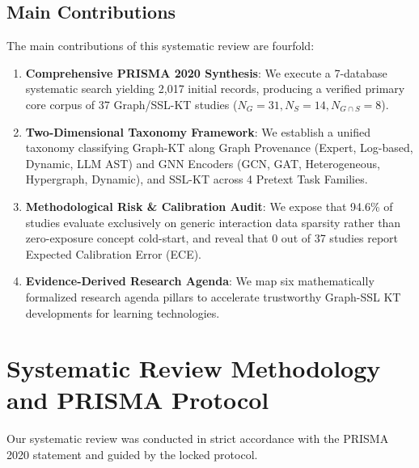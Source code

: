 \documentclass[journal]{IEEEtran}
\begin{document}
\subsection{Main Contributions}
The main contributions of this systematic review are fourfold:
\begin{enumerate}
    \item \textbf{Comprehensive PRISMA 2020 Synthesis}: We execute a 7-database systematic search yielding 2,017 initial records, producing a verified primary core corpus of 37 Graph/SSL-KT studies ($N_G=31, N_S=14, N_{G \cap S}=8$).
    \item \textbf{Two-Dimensional Taxonomy Framework}: We establish a unified taxonomy classifying Graph-KT along Graph Provenance (Expert, Log-based, Dynamic, LLM AST) and GNN Encoders (GCN, GAT, Heterogeneous, Hypergraph, Dynamic), and SSL-KT across 4 Pretext Task Families.
    \item \textbf{Methodological Risk \& Calibration Audit}: We expose that 94.6\% of studies evaluate exclusively on generic interaction data sparsity rather than zero-exposure concept cold-start, and reveal that 0 out of 37 studies report Expected Calibration Error (ECE).
    \item \textbf{Evidence-Derived Research Agenda}: We map six mathematically formalized research agenda pillars to accelerate trustworthy Graph-SSL KT developments for learning technologies.
\end{enumerate}

\section{Systematic Review Methodology and PRISMA Protocol}
\label{sec:methodology}

Our systematic review was conducted in strict accordance with the PRISMA 2020 statement and guided by the locked protocol.
\end{document}

